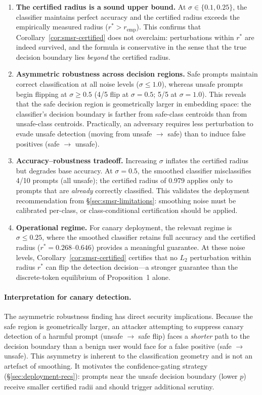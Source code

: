 \begin{enumerate}
\item \textbf{The certified radius is a sound upper bound.} At $\sigma \in \{0.1, 0.25\}$, the classifier maintains perfect accuracy and the certified radius exceeds the empirically measured radius ($r^* > r_{\text{emp}}$). This confirms that Corollary~\ref{cor:smsr-certified} does not overclaim: perturbations within $r^*$ are indeed survived, and the formula is conservative in the sense that the true decision boundary lies \emph{beyond} the certified radius.

\item \textbf{Asymmetric robustness across decision regions.} Safe prompts maintain correct classification at all noise levels ($\sigma \leq 1.0$), whereas unsafe prompts begin flipping at $\sigma \geq 0.5$ (4/5 flip at $\sigma = 0.5$; 5/5 at $\sigma = 1.0$). This reveals that the safe decision region is geometrically larger in embedding space: the classifier's decision boundary is farther from safe-class centroids than from unsafe-class centroids. Practically, an adversary requires less perturbation to evade unsafe detection (moving from unsafe $\to$ safe) than to induce false positives (safe $\to$ unsafe).

\item \textbf{Accuracy--robustness tradeoff.} Increasing $\sigma$ inflates the certified radius but degrades base accuracy. At $\sigma = 0.5$, the smoothed classifier misclassifies 4/10 prompts (all unsafe); the certified radius of 0.979 applies only to prompts that are \emph{already} correctly classified. This validates the deployment recommendation from \S\ref{sec:smsr-limitations}: smoothing noise must be calibrated per-class, or class-conditional certification should be applied.

\item \textbf{Operational regime.} For canary deployment, the relevant regime is $\sigma \leq 0.25$, where the smoothed classifier retains full accuracy and the certified radius ($r^* = 0.268$--$0.646$) provides a meaningful guarantee. At these noise levels, Corollary~\ref{cor:smsr-certified} certifies that no $L_2$ perturbation within radius $r^*$ can flip the detection decision---a stronger guarantee than the discrete-token equilibrium of Proposition~1 alone.
\end{enumerate}

\paragraph{Interpretation for canary detection.} The asymmetric robustness finding has direct security implications. Because the safe region is geometrically larger, an attacker attempting to suppress canary detection of a harmful prompt (unsafe $\to$ safe flip) faces a \emph{shorter} path to the decision boundary than a benign user would face for a false positive (safe $\to$ unsafe). This asymmetry is inherent to the classification geometry and is not an artefact of smoothing. It motivates the confidence-gating strategy (\S\ref{sec:deployment-recs}): prompts near the unsafe decision boundary (lower $\underline{p}$) receive smaller certified radii and should trigger additional scrutiny.

